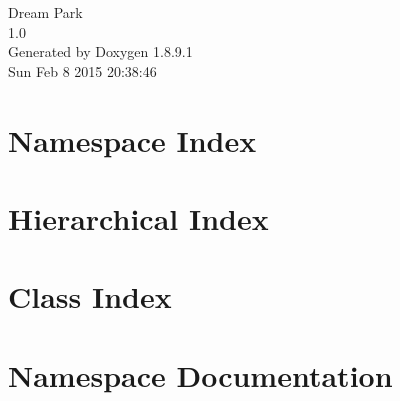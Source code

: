 \documentclass[twoside]{book}
\newcommand{\+}{\discretionary{\mbox{\scriptsize$\hookleftarrow$}}{}{}}
\newcommand{\clearemptydoublepage}{%
  \newpage{\pagestyle{empty}\cleardoublepage}%
}
\begin{document}
\hypersetup{pageanchor=false,
             bookmarks=true,
             bookmarksnumbered=true,
             pdfencoding=unicode
            }
\begin{titlepage}
\vspace*{7cm}
\begin{center}%
{\Large Dream Park \\[1ex]\large 1.\+0 }\\
\vspace*{1cm}
{\large Generated by Doxygen 1.8.9.1}\\
\vspace*{0.5cm}
{\small Sun Feb 8 2015 20:38:46}\\
\end{center}
\end{titlepage}
\clearemptydoublepage
\tableofcontents
\clearemptydoublepage
{}
\hypersetup{pageanchor=true}

\chapter{Namespace Index}

\chapter{Hierarchical Index}

\chapter{Class Index}

\chapter{Namespace Documentation}

















\end{document}
